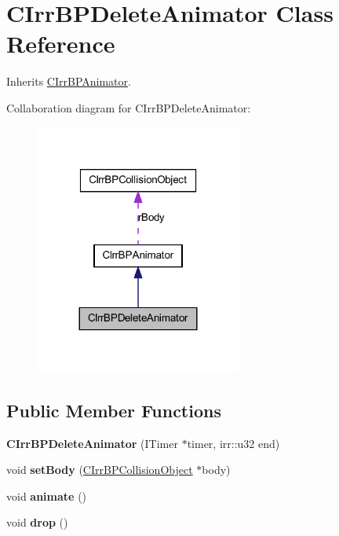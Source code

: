 \hypertarget{class_c_irr_b_p_delete_animator}{
\section{CIrrBPDeleteAnimator Class Reference}
\label{class_c_irr_b_p_delete_animator}
}


Inherits \hyperlink{class_c_irr_b_p_animator}{CIrrBPAnimator}.



Collaboration diagram for CIrrBPDeleteAnimator:\nopagebreak
\begin{figure}[H]
\begin{center}
\leavevmode
\includegraphics[width=192pt]{class_c_irr_b_p_delete_animator__coll__graph}
\end{center}
\end{figure}
\subsection*{Public Member Functions}
\begin{DoxyCompactItemize}
\item 
\hypertarget{class_c_irr_b_p_delete_animator_a2eef152cff22579d3c706a2444b611ec}{
{\bfseries CIrrBPDeleteAnimator} (ITimer $\ast$timer, irr::u32 end)}
\label{class_c_irr_b_p_delete_animator_a2eef152cff22579d3c706a2444b611ec}

\item 
\hypertarget{class_c_irr_b_p_delete_animator_a43f488458de194236a290c6ca0f885ea}{
void {\bfseries setBody} (\hyperlink{class_c_irr_b_p_collision_object}{CIrrBPCollisionObject} $\ast$body)}
\label{class_c_irr_b_p_delete_animator_a43f488458de194236a290c6ca0f885ea}

\item 
\hypertarget{class_c_irr_b_p_delete_animator_a41ce1c90f4f4f316e3a08a5a431a5769}{
void {\bfseries animate} ()}
\label{class_c_irr_b_p_delete_animator_a41ce1c90f4f4f316e3a08a5a431a5769}

\item 
\hypertarget{class_c_irr_b_p_delete_animator_a10fcff4d2fd949ea59596a827a76a057}{
void {\bfseries drop} ()}
\label{class_c_irr_b_p_delete_animator_a10fcff4d2fd949ea59596a827a76a057}

\end{DoxyCompactItemize}


